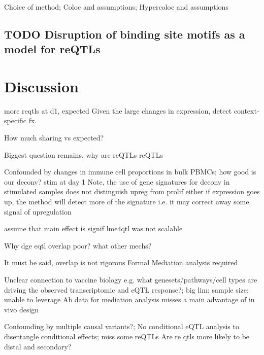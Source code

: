 Choice of method; 
Coloc and assumptions; Hypercoloc and assumptions

\subsection{TODO Disruption of binding site motifs as a model for reQTLs}

\section{Discussion}

more reqtls at d1, expected
Given the large changes in expression, detect context-specific fx.


How much sharing vs expected?


Biggest question remains, why are reQTLs reQTLs

Confounded by changes in immune cell proportions in bulk PBMCs;
how good is our deconv? stim at day 1
Note, the use of gene signatures for deconv
    in stimulated samples
    does not distinguish upreg from prolif either
    if expression goes up, the method will detect more of the signature
    i.e. it may correct away some signal of upregulation

assume that main effect is signif 
lme4qtl was not scalable


Why dge eqtl overlap poor?
what other mechs?

It must be said, overlap is not rigorous
Formal Mediation analysis required

Unclear connection to vaccine biology e.g. what genesets/pathways/cell types are driving the observed transcriptomic and eQTL response?;
big lim: sample size: unable to leverage Ab data for mediation analysis
misses a main advantage of in vivo design


Confounding by multiple causal variants?;
No conditional eQTL analysis to disentangle conditional effects;
miss some reQTLs
Are re qtls more likely to be distal and secondary?


